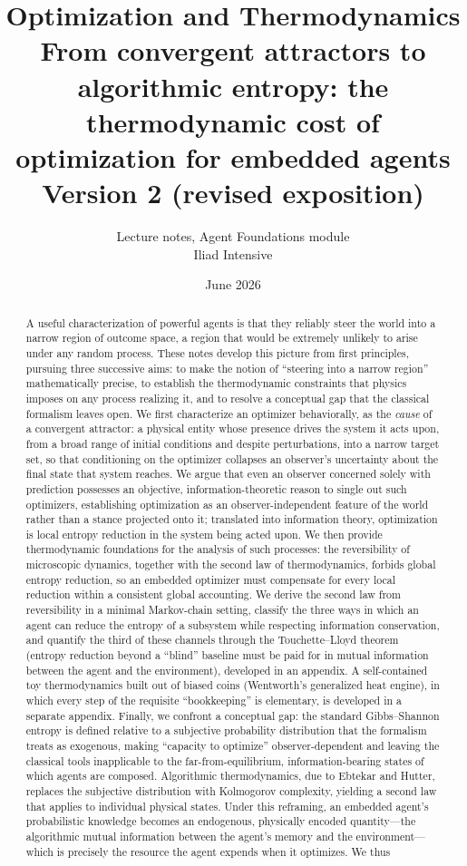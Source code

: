 \documentclass[10pt]{article}
\title{Optimization and Thermodynamics \\[1ex]
{\large From convergent attractors to algorithmic entropy: the thermodynamic cost of optimization for embedded agents} \\[1ex]
{\normalsize Version 2 (revised exposition)}}
\author{Lecture notes, Agent Foundations module \\ Iliad Intensive}
\date{June 2026}
\theoremstyle{definition}
\theoremstyle{remark}
\begin{document}
\maketitle

\begin{abstract}
A useful characterization of powerful agents is that they reliably steer the world into a narrow region of outcome space, a region that would be extremely unlikely to arise under any random process. These notes develop this picture from first principles, pursuing three successive aims: to make the notion of ``steering into a narrow region'' mathematically precise, to establish the thermodynamic constraints that physics imposes on any process realizing it, and to resolve a conceptual gap that the classical formalism leaves open. We first characterize an optimizer behaviorally, as the \emph{cause} of a convergent attractor: a physical entity whose presence drives the system it acts upon, from a broad range of initial conditions and despite perturbations, into a narrow target set, so that conditioning on the optimizer collapses an observer's uncertainty about the final state that system reaches. We argue that even an observer concerned solely with prediction possesses an objective, information-theoretic reason to single out such optimizers, establishing optimization as an observer-independent feature of the world rather than a stance projected onto it; translated into information theory, optimization is local entropy reduction in the system being acted upon. We then provide thermodynamic foundations for the analysis of such processes: the reversibility of microscopic dynamics, together with the second law of thermodynamics, forbids global entropy reduction, so an embedded optimizer must compensate for every local reduction within a consistent global accounting. We derive the second law from reversibility in a minimal Markov-chain setting, classify the three ways in which an agent can reduce the entropy of a subsystem while respecting information conservation, and quantify the third of these channels through the Touchette--Lloyd theorem (entropy reduction beyond a ``blind'' baseline must be paid for in mutual information between the agent and the environment), developed in an appendix. A self-contained toy thermodynamics built out of biased coins (Wentworth's generalized heat engine), in which every step of the requisite ``bookkeeping'' is elementary, is developed in a separate appendix. Finally, we confront a conceptual gap: the standard Gibbs--Shannon entropy is defined relative to a subjective probability distribution that the formalism treats as exogenous, making ``capacity to optimize'' observer-dependent and leaving the classical tools inapplicable to the far-from-equilibrium, information-bearing states of which agents are composed. Algorithmic thermodynamics, due to Ebtekar and Hutter, replaces the subjective distribution with Kolmogorov complexity, yielding a second law that applies to individual physical states. Under this reframing, an embedded agent's probabilistic knowledge becomes an endogenous, physically encoded quantity---the algorithmic mutual information between the agent's memory and the environment---which is precisely the resource the agent expends when it optimizes. We thus 
\end{abstract}
\end{document}
